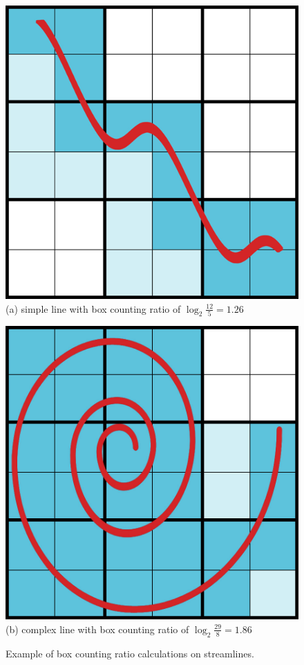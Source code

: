 \documentclass{egpubl}
\begin{document}
\begin{figure}[h]
        \centering
                \begin{minipage}{0.49\linewidth}
                        \small
                        \includegraphics[height = .95\linewidth]{Images/line.png} \\ (a) simple line with box counting ratio of $\log_2\frac{12}{5} = 1.26$
                \end{minipage}
                \begin{minipage}{0.49\linewidth}
                        \small
                        \includegraphics[height = .95\linewidth]{Images/spiral.jpg} \\ (b) complex line with box counting ratio of $\log_2\frac{29}{8} = 1.86$
                \end{minipage}
        \caption{Example of box counting ratio calculations on streamlines.}
        \label{fig:box_counting_calcs}
\end{figure}
\end{document}

